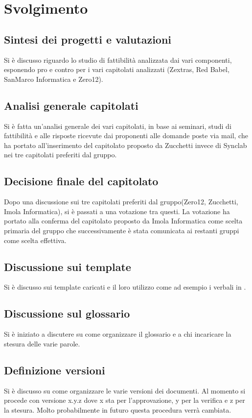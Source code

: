 \section*{Svolgimento}
\subsection*{Sintesi dei progetti e valutazioni}
			Si è discusso riguardo lo studio di fattibilità analizzata dai vari componenti, esponendo pro e contro per i vari capitolati analizzati (Zextras, Red Babel, SanMarco Informatica e Zero12).

\subsection*{Analisi generale capitolati}
			Si è fatta un'analisi generale dei vari capitolati, in base ai seminari, studi di fattibilità e alle risposte ricevute dai proponenti alle domande poste via mail, che ha portato all'inserimento del capitolato proposto da Zucchetti invece di Synclab nei tre capitolati preferiti dal gruppo. 


\subsection*{Decisione finale del capitolato}
			Dopo una discussione sui tre capitolati preferiti dal gruppo(Zero12, Zucchetti, Imola Informatica), si è passati a una votazione tra questi. La votazione ha portato alla conferma del capitolato proposto da Imola Informatica come scelta primaria del gruppo che successivamente è stata comunicata ai restanti gruppi come scelta effettiva.

\subsection*{Discussione sui template}
			Si è discusso sui template caricati e il loro utilizzo come ad esempio i verbali in \glock{\LaTeX}.


\subsection*{Discussione sul glossario}
      		Si è iniziato a discutere su come organizzare il glossario e a chi incaricare la stesura delle varie parole.


\subsection*{Definizione versioni}
			Si è discusso su come organizzare le varie versioni dei documenti.
			Al momento si procede con versione x.y.z dove x sta per l'approvazione, y per la verifica e z per la stesura.
			Molto probabilmente in futuro questa procedura verrà cambiata.


